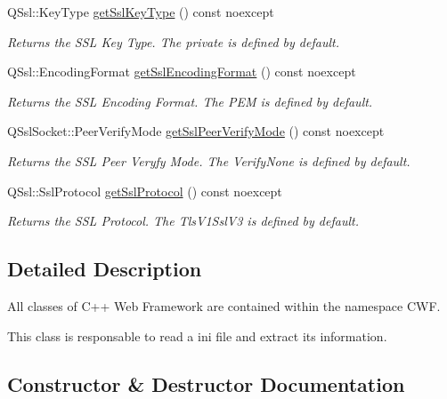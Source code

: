 \begin{DoxyCompactItemize}
Q\+Ssl\+::\+Key\+Type \hyperlink{class_configuration_abd78f9eb7315e0b0ed5c7d3088ce1795}{get\+Ssl\+Key\+Type} () const noexcept
\begin{DoxyCompactList}\small\item\em Returns the S\+SL Key Type. The private is defined by default. \end{DoxyCompactList}\item 
Q\+Ssl\+::\+Encoding\+Format \hyperlink{class_configuration_aa839f957ac9af33187140649b38785ef}{get\+Ssl\+Encoding\+Format} () const noexcept
\begin{DoxyCompactList}\small\item\em Returns the S\+SL Encoding Format. The P\+EM is defined by default. \end{DoxyCompactList}\item 
Q\+Ssl\+Socket\+::\+Peer\+Verify\+Mode \hyperlink{class_configuration_ae7e5872717b012e16dc2255d1741e422}{get\+Ssl\+Peer\+Verify\+Mode} () const noexcept
\begin{DoxyCompactList}\small\item\em Returns the S\+SL Peer Veryfy Mode. The Verify\+None is defined by default. \end{DoxyCompactList}\item 
Q\+Ssl\+::\+Ssl\+Protocol \hyperlink{class_configuration_acfe38d1e3f4801c942ad2e57165509f7}{get\+Ssl\+Protocol} () const noexcept
\begin{DoxyCompactList}\small\item\em Returns the S\+SL Protocol. The Tls\+V1\+Ssl\+V3 is defined by default. \end{DoxyCompactList}\end{DoxyCompactItemize}


\subsection{Detailed Description}
All classes of C++ Web Framework are contained within the namespace C\+WF. 

This class is responsable to read a ini file and extract its information. 

\subsection{Constructor \& Destructor Documentation}
\mbox{\label{class_configuration_a60b4858740fb32114fa5f4e72577fa7a}} 

